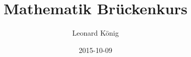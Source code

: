 \documentclass[10pt,a4paper]{article}
\author{Leonard König}
\title{Mathematik Brückenkurs}
\date{2015-10-09}
\begin{document}
\maketitle
\tableofcontents
\newtheorem{defi}{Definition}



\end{document}
